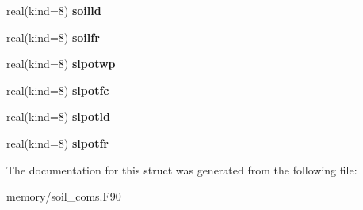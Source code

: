 \begin{DoxyCompactItemize}
\item 
\hypertarget{structsoil__coms_1_1soil__class8_a0c1fb28fa7e98d14b115d58a6b88ab9b}{
real(kind=8) {\bfseries soilld}}
\label{structsoil__coms_1_1soil__class8_a0c1fb28fa7e98d14b115d58a6b88ab9b}

\item 
\hypertarget{structsoil__coms_1_1soil__class8_aa21cc49ddb21daca2a8410f981befa07}{
real(kind=8) {\bfseries soilfr}}
\label{structsoil__coms_1_1soil__class8_aa21cc49ddb21daca2a8410f981befa07}

\item 
\hypertarget{structsoil__coms_1_1soil__class8_a493e4af60b1b40c9420440fbefd342b3}{
real(kind=8) {\bfseries slpotwp}}
\label{structsoil__coms_1_1soil__class8_a493e4af60b1b40c9420440fbefd342b3}

\item 
\hypertarget{structsoil__coms_1_1soil__class8_aafc4c96e7fd4620fc97e77213d40051a}{
real(kind=8) {\bfseries slpotfc}}
\label{structsoil__coms_1_1soil__class8_aafc4c96e7fd4620fc97e77213d40051a}

\item 
\hypertarget{structsoil__coms_1_1soil__class8_a405447c7ad1cee6f9fb30c1169d65c11}{
real(kind=8) {\bfseries slpotld}}
\label{structsoil__coms_1_1soil__class8_a405447c7ad1cee6f9fb30c1169d65c11}

\item 
\hypertarget{structsoil__coms_1_1soil__class8_aebd17d532bcc9b55de3b5c4eba7e2e8f}{
real(kind=8) {\bfseries slpotfr}}
\label{structsoil__coms_1_1soil__class8_aebd17d532bcc9b55de3b5c4eba7e2e8f}

\end{DoxyCompactItemize}


The documentation for this struct was generated from the following file:\begin{DoxyCompactItemize}
\item 
memory/soil\_\-coms.F90\end{DoxyCompactItemize}
